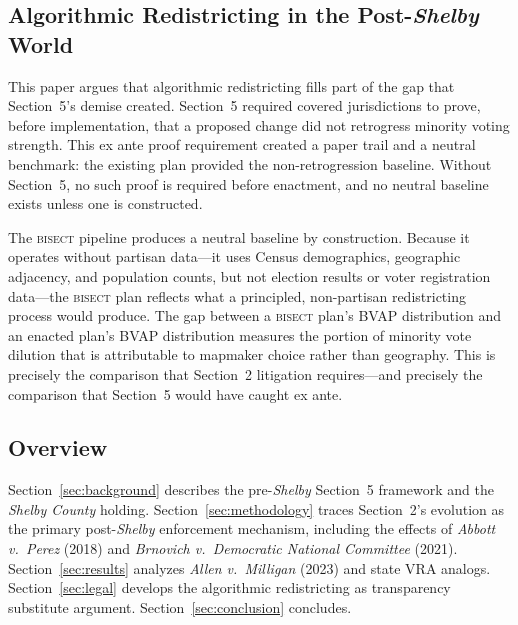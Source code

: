\subsection{Algorithmic Redistricting in the Post-\textit{Shelby} World}

This paper argues that algorithmic redistricting fills part of the gap
that Section~5's demise created. Section~5 required covered jurisdictions
to prove, before implementation, that a proposed change did not retrogress
minority voting strength. This ex ante proof requirement created a paper
trail and a neutral benchmark: the existing plan provided the non-retrogression
baseline. Without Section~5, no such proof is required before enactment,
and no neutral baseline exists unless one is constructed.

The \textsc{bisect} pipeline produces a neutral baseline by construction.
Because it operates without partisan data---it uses Census demographics,
geographic adjacency, and population counts, but not election results or
voter registration data---the \textsc{bisect} plan reflects what a
principled, non-partisan redistricting process would produce. The gap
between a \textsc{bisect} plan's BVAP distribution and an enacted plan's
BVAP distribution measures the portion of minority vote dilution that
is attributable to mapmaker choice rather than geography. This is precisely
the comparison that Section~2 litigation requires---and precisely the
comparison that Section~5 would have caught ex ante.

\subsection{Overview}

Section~\ref{sec:background} describes the pre-\textit{Shelby} Section~5
framework and the \textit{Shelby County} holding.
Section~\ref{sec:methodology} traces Section~2's evolution as the primary
post-\textit{Shelby} enforcement mechanism, including the effects of
\textit{Abbott v.\ Perez} (2018) and \textit{Brnovich v.\ Democratic
National Committee} (2021).
Section~\ref{sec:results} analyzes \textit{Allen v.\ Milligan} (2023)
and state VRA analogs.
Section~\ref{sec:legal} develops the algorithmic redistricting as
transparency substitute argument.
Section~\ref{sec:conclusion} concludes.
